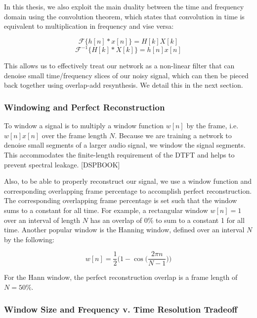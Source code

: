 In this thesis, we also exploit the main duality between the time and frequency domain using the convolution theorem, which states that convolution in time is equivalent to multiplication in frequency and vise versa:

\begin{equation}
\mathscr{F} \{h[n] * x[n]\} = H[k] X[k]
\end{equation}
\begin{equation}
\mathscr{F}^{-1} \{H[k] * X[k]\} = h[n] x[n]
\end{equation}

This allows us to effectively treat our network as a non-linear filter that can denoise small time/frequency slices of our noisy signal, which can then be pieced back together using overlap-add resynthesis. We detail this in the next section.

\subsubsection{Windowing and Perfect Reconstruction}
To window a signal is to multiply a window function $w[n]$ by the frame, i.e. $w[n]x[n]$ over the frame length $N$. Because we are training a network to denoise small segments of a larger audio signal, we window the signal segments. This accommodates the finite-length requirement of the DTFT and helps to prevent spectral leakage. [DSPBOOK]

Also, to be able to properly reconstruct our signal, we use a window function and corresponding overlapping frame percentage to accomplish perfect reconstruction. The corresponding overlapping frame percentage is set such that the window sums to a constant for all time. For example, a rectangular window $w[n]=1$ over an interval of length $N$ has an overlap of 0\% to sum to a constant 1 for all time. Another popular window is the Hanning window, defined over an interval $N$ by the following:

\begin{equation}
w[n] = \dfrac{1}{2} \bigg( 1-\cos \bigg(\dfrac{2 \pi n}{N - 1} \bigg)\bigg)
\end{equation}

For the Hann window, the perfect reconstruction overlap is a frame length of $N=50\%$.

\subsubsection{Window Size and Frequency v. Time Resolution Tradeoff}

